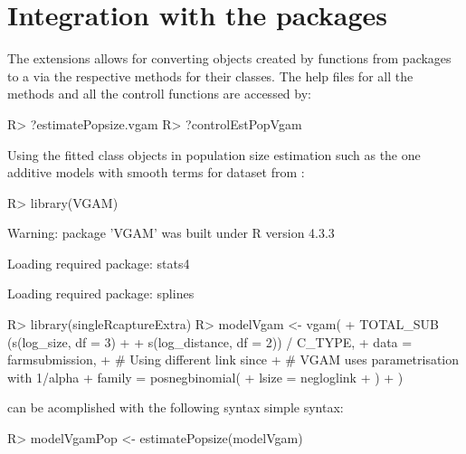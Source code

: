 \documentclass[
]{jss}
\newcommand{\1}{\mathcal{I}} \newcommand{\bZero}{\boldsymbol{0}}
\begin{document}
\section[Integration with the]{Integration with the 
packages}\label{VGAMcountreg-packages}

The  extensions allows for converting objects
created by  functions from packages
 to a  via the
respective  methods for their classes. The help
files for all the methods and all the controll functions are accessed
by:

\begin{CodeChunk}
\begin{CodeInput}
R> ?estimatePopsize.vgam
R> ?controlEstPopVgam
\end{CodeInput}
\end{CodeChunk}

Using the fitted  class objects in
population size estimation such as the one additive models with smooth
terms for dataset from \cite{chao}:

\begin{CodeChunk}
\begin{CodeInput}
R> library(VGAM)
\end{CodeInput}
\begin{CodeOutput}
Warning: package 'VGAM' was built under R version 4.3.3
\end{CodeOutput}
\begin{CodeOutput}
Loading required package: stats4
\end{CodeOutput}
\begin{CodeOutput}
Loading required package: splines
\end{CodeOutput}
\begin{CodeInput}
R> library(singleRcaptureExtra)
R> modelVgam <- vgam(
+   TOTAL_SUB ~ (s(log_size, df  = 3) + 
+                  s(log_distance, df  = 2)) / C_TYPE,
+   data = farmsubmission,
+   # Using different link since
+   # VGAM uses parametrisation with 1/alpha
+   family = posnegbinomial(
+     lsize = negloglink
+   )
+ )
\end{CodeInput}
\end{CodeChunk}

can be acomplished with the following syntax simple syntax:

\begin{CodeChunk}
\begin{CodeInput}
R> modelVgamPop <- estimatePopsize(modelVgam)
\end{CodeInput}
\end{CodeChunk}
\end{document}
